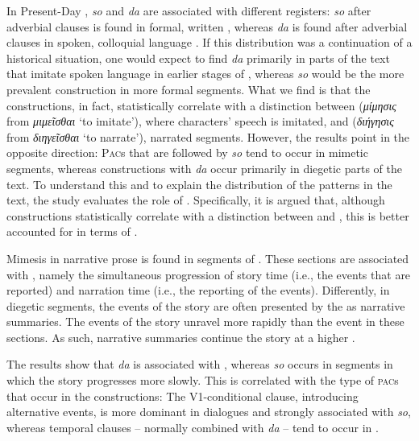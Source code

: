 \documentclass[output=paper,colorlinks,citecolor=brown]{langscibook}
\begin{document}
In Present-Day , \textit{so} and \textit{da} are associated with different registers: \textit{so} after adverbial clauses is found in formal, written , whereas \textit{da} is found after adverbial clauses in spoken, colloquial language \citep{Condoyannis1944, Weinert2007, Catasso2021}. If this distribution was a continuation of a historical situation, one would expect to find \textit{da} primarily in parts of the text that imitate spoken language in earlier stages of , whereas \textit{so} would be the more prevalent construction in more formal segments. What we find is that the constructions, in fact, statistically correlate with a distinction between  (\textit{μίμησις} from \textit{μιμεῖσθαι} `to imitate'), where characters' speech is imitated, and  (\textit{διήγησις} from \textit{διηγεῖσθαι} `to narrate'), narrated segments. However, the results point in the opposite direction: \textsc{Pac}s that are followed by \textit{so} tend to occur in mimetic segments, whereas constructions with \textit{da} occur primarily in diegetic parts of the text. To understand this and to explain the distribution of the patterns in the text, the study evaluates the role of  \citep[e.g.,][]{Genette1980, Packard2008}. Specifically, it is argued that, although constructions statistically correlate with a distinction between  and , this is better accounted for in terms of  \citep[e.g.,][]{Genette1980, Packard2008}.

Mimesis in narrative prose is found in segments of . These sections are associated with , namely the simultaneous progression of story time (i.e., the events that are reported) and narration time (i.e., the reporting of the events). Differently, in diegetic segments, the events of the story are often presented by the  as narrative summaries. The events of the story unravel more rapidly than the  event in these sections. As such, narrative summaries continue the story at a higher .

The results show that \textit{da} is associated with , whereas \textit{so} occurs in segments in which the story progresses more slowly. This is correlated with the type of \textsc{pac}s that occur in the constructions: The V1-conditional clause, introducing alternative events, is more dominant in dialogues and strongly associated with \textit{so}, whereas temporal clauses -- normally combined with \textit{da} -- tend to occur in .
\end{document}
